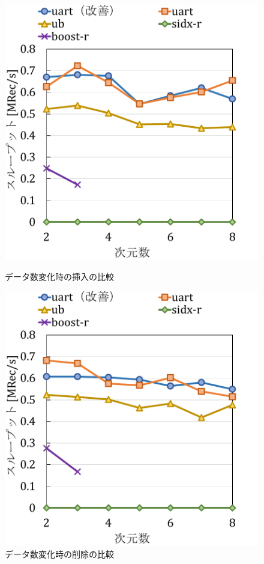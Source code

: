 \begin{figure}[tb]
  \begin{minipage}[c]{0.495\textwidth}
    \centering
    \includegraphics[scale=0.5]{./figures/graph-dimention-update-0.pdf}
    \caption{データ数変化時の挿入の比較}
    \label{graph:grouped}
  \end{minipage}
  \begin{minipage}[c]{0.495\textwidth}
    \centering
    \includegraphics[scale=0.5]{./figures/graph-dimention-update-0.5.pdf}
    \caption{データ数変化時の削除の比較}
    \label{graph:paired}
  \end{minipage}
\end{figure}

